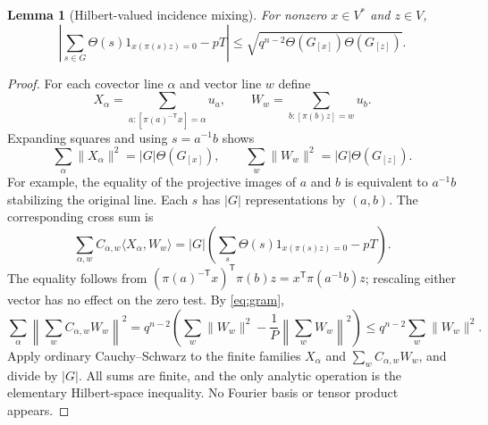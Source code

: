 \documentclass[11pt]{article}
\newtheorem{lemma}[theorem]{Lemma}
\theoremstyle{remark}\newtheorem{remark}[theorem]{Remark}
\newcommand{\wt}{\Theta}
\begin{document}
\begin{lemma}[Hilbert-valued incidence mixing]\label{lem:mix}
For nonzero $x\in V^*$ and $z\in V$,
\begin{equation}\label{eq:mix}
 \left|\sum_{s\in G}\wt(s)1_{x(\pi(s)z)=0}-pT\right|
 \le \sqrt{q^{n-2}\wt(G_{[x]})\wt(G_{[z]})}.
\end{equation}
\end{lemma}
\begin{proof}
For each covector line $\alpha$ and vector line $w$ define
\[
 X_\alpha=\sum_{a:[\pi(a)^{-\mathsf T}x]=\alpha}u_a,
 \qquad W_w=\sum_{b:[\pi(b)z]=w}u_b.
\]
Expanding squares and using $s=a^{-1}b$ shows
\[
 \sum_\alpha\|X_\alpha\|^2=|G|\wt(G_{[x]}),\qquad
 \sum_w\|W_w\|^2=|G|\wt(G_{[z]}).
\]
For example, the equality of the projective images of $a$ and $b$ is equivalent to $a^{-1}b$ stabilizing the original line. Each $s$ has $|G|$ representations by $(a,b)$. The corresponding cross sum is
\[
 \sum_{\alpha,w} C_{\alpha,w}\langle X_\alpha,W_w\rangle
 =|G|\left(\sum_s\wt(s)1_{x(\pi(s)z)=0}-pT\right).
\]
The equality follows from $(\pi(a)^{-\mathsf T}x)^{\mathsf T}\pi(b)z=x^{\mathsf T}\pi(a^{-1}b)z$; rescaling either vector has no effect on the zero test. By \eqref{eq:gram},
\[
 \sum_\alpha\left\|\sum_w C_{\alpha,w}W_w\right\|^2
 =q^{n-2}\left(\sum_w\|W_w\|^2-
 \frac{1}{P}\left\|\sum_w W_w\right\|^2\right)
 \le q^{n-2}\sum_w\|W_w\|^2.
\]
Apply ordinary Cauchy--Schwarz to the finite families $X_\alpha$ and $\sum_w C_{\alpha,w}W_w$, and divide by $|G|$. All sums are finite, and the only analytic operation is the elementary Hilbert-space inequality. No Fourier basis or tensor product appears.
\end{proof}
\end{document}
